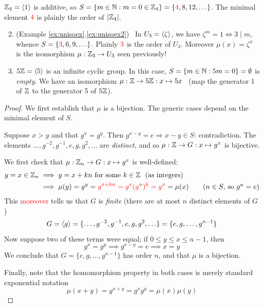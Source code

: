 \begin{examples}{}{}
	\exstart $\mathbb{Z}_4=\left\langle 1\right\rangle$ is additive, so $S=\{m\in\mathbb{N}:m=0\in\mathbb{Z}_4\}=\{\textcolor{red}{4},8,12,\ldots\}$. The minimal element $\textcolor{red}{4}$ is plainly the order of $\left| \mathbb{Z}_4\right|$.
	\begin{enumerate}\setcounter{enumi}{1}%
	  \item (Example \ref*{ex:unisoex}.\ref{ex:unisoex2}) \ In $U_3=\left\langle \zeta\right\rangle$, we have $\zeta^m=1\Longleftrightarrow 3\mid m$, whence $S=\{\textcolor{red}{3},6,9,\ldots\}$. Plainly $\textcolor{red}{3}$ is the order of $U_3$. Moreover $\mu(x)=\zeta^x$ is the isomorphism $\mu:\mathbb{Z}_3\to U_3$ seen previously!
	  
	  \goodbreak
	  
	  \item $5\mathbb{Z}=\left\langle 5\right\rangle$ is an infinite cyclic group. In this case, $S=\{m\in\mathbb{N}:5m=0\}=\emptyset$ is \emph{empty}. We have an isomorphism $\mu:\mathbb{Z}\to 5\mathbb{Z}:x\mapsto 5x$ \ (map the generator 1 of $\mathbb{Z}$ to the generator 5 of $5\mathbb{Z}$).
	\end{enumerate}
\end{examples}





\begin{proof}
	We first establish that $\mu$ is a bijection. The generic cases depend on the minimal element of $S$.
	\begin{description}\itemsep2pt
		\item[Case 1: $S=\emptyset$.]\quad Suppose $x>y$ and that $g^x=g^y$. Then $g^{x-y}=e\Longrightarrow x-y\in S$: contradiction. The elements $\ldots,g^{-2},g^{-1},e,g,g^2,\ldots$ are \emph{distinct,} and so $\mu:\mathbb{Z}\to G:x\mapsto g^x$ is bijective.
		\item[Case 2: $\min S=n$.]\quad We first check that $\mu:\mathbb{Z}_n\to G:x\mapsto g^x$ is well-defined:
		\begin{align*}
			y=x\in\mathbb{Z}_n&\implies y=x+kn\text{ for some $k\in\mathbb{Z}$ \ (as integers)}\\
			&\implies \mu(y) =g^y =\textcolor{red}{g^{x+kn}=g^x(g^n)^k =g^x} =\mu(x) \tag{$n\in S$, so $g^n=e$}
		\end{align*}
		This \textcolor{red}{moreover} tells us that $G$ is \emph{finite} (there are at most $n$ distinct elements of $G$)
		\[
			G=\left\langle g\right\rangle =\{\ldots,g^{-2},g^{-1},e,g,g^2,\ldots\} =\{e,g,\ldots,g^{n-1}\}
		\]
		Now suppose two of these terms were equal; if $0\le y\le x\le n-1$, then
		\[
			g^x=g^y\implies g^{x-y}=e\implies x=y \tag{$0\le x-y\le n-1<n=\min S$}
		\]
		We conclude that $G=\{e,g,\ldots,g^{n-1}\}$ has order $n$, and that $\mu$ is a bijection.
	\end{description}\medskip
	Finally, note that the homomorphism property in both cases is merely standard exponential notation
	\[
		\mu(x+y)=g^{x+y}=g^xg^y=\mu(x)\mu(y)\tag*{\qedhere}
	\]
\end{proof}

